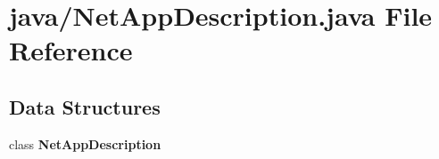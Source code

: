 \section{java/\-Net\-App\-Description.java File Reference}
\label{NetAppDescription_8java}
\subsection*{Data Structures}
\begin{DoxyCompactItemize}
\item 
class {\bf Net\-App\-Description}
\end{DoxyCompactItemize}
